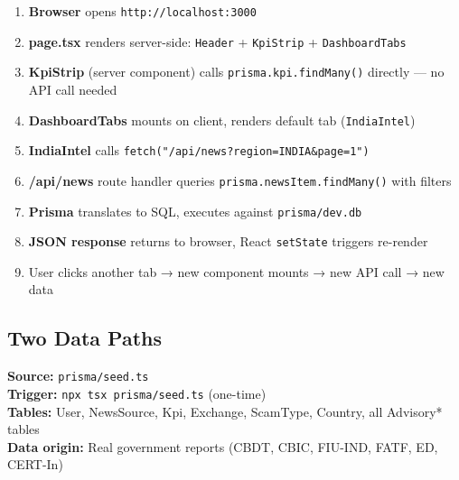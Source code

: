 \documentclass[12pt,a4paper]{article}
\begin{document}
\begin{enumerate}[nosep]
    \item \textbf{Browser} opens \texttt{http://localhost:3000}
    \item \textbf{page.tsx} renders server-side: \texttt{Header} + \texttt{KpiStrip} + \texttt{DashboardTabs}
    \item \textbf{KpiStrip} (server component) calls \texttt{prisma.kpi.findMany()} directly — no API call needed
    \item \textbf{DashboardTabs} mounts on client, renders default tab (\texttt{IndiaIntel})
    \item \textbf{IndiaIntel} calls \texttt{fetch("/api/news?region=INDIA\&page=1")}
    \item \textbf{/api/news} route handler queries \texttt{prisma.newsItem.findMany()} with filters
    \item \textbf{Prisma} translates to SQL, executes against \texttt{prisma/dev.db}
    \item \textbf{JSON response} returns to browser, React \texttt{setState} triggers re-render
    \item User clicks another tab → new component mounts → new API call → new data
\end{enumerate}

\subsection{Two Data Paths}

\begin{tcolorbox}[title=\textbf{Path A: Static Reference Data},colback=blueaccent!5!white,colframe=blueaccent!50!black]
\textbf{Source:} \texttt{prisma/seed.ts}\\
\textbf{Trigger:} \texttt{npx tsx prisma/seed.ts} (one-time)\\
\textbf{Tables:} User, NewsSource, Kpi, Exchange, ScamType, Country, all Advisory* tables\\
\textbf{Data origin:} Real government reports (CBDT, CBIC, FIU-IND, FATF, ED, CERT-In)
\end{tcolorbox}

\vspace{0.5em}
\end{document}
